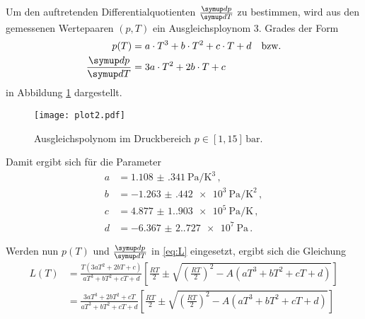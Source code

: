 Um den auftretenden Differentialquotienten $\frac{\dif{p}}{\dif{T}}$ zu bestimmen,
wird aus den gemessenen Wertepaaren $(p,T)$ ein Ausgleichsploynom 3. Grades der Form
\begin{align*}
    p(T) &= a \cdot T^{3} + b \cdot T^{2} + c \cdot T+d \quad \text{bzw.} \\
    \frac{\dif{p}}{\dif{T}} &= 3a \cdot T^{2} + 2b \cdot T + c \quad 
\end{align*}
in Abbildung \ref{fig:plot2} dargestellt.
\begin{figure}[H]
    \centering
    \texttt{[image: plot2.pdf]}
    \caption{Ausgleichspolynom im Druckbereich $p \in [1, 15] \, \mathrm{bar}$.}
    \label{fig:plot2}
\end{figure}

Damit ergibt sich für die Parameter
\begin{align*}
    a &= \qty{1.108(341)}{\pascal\per\cubic\kelvin} \, , \\
    b &= \qty{-1.263(442)e3}{\pascal\per\kelvin\squared} \, , \\ %
    c &= \qty{4.877(1.903)e5}{\pascal\per\kelvin} \, , \\ %
    d &= \qty{-6.367(2.727)e7}{\pascal} \, . %
\end{align*}

Werden nun $p(T)$ und $\frac{\dif{p}}{\dif{T}}$ in \ref{eq:L} eingesetzt, 
ergibt sich die Gleichung 
\begin{align}
    L(T) &= \frac{T \left(3 a T^{2}+2 b T+c\right)}{a T^{3}+b T^{2}+c T+d} \left[\frac{R T}{2} \pm \sqrt{\left(\frac{R T}{2}\right)^{2}-A \left(a T^{3}+b T^{2}+c T+d\right)}\right]  \\
    &= \frac{3 a T^{3}+2 b T^{2}+c T}{a T^{3}+b T^{2}+c T+d} \left[\frac{R T}{2} \pm \sqrt{\left(\frac{R T}{2}\right)^{2}-A\left(a T^{3}+b T^{2}+c T+d\right)}\right] 
\end{align}
